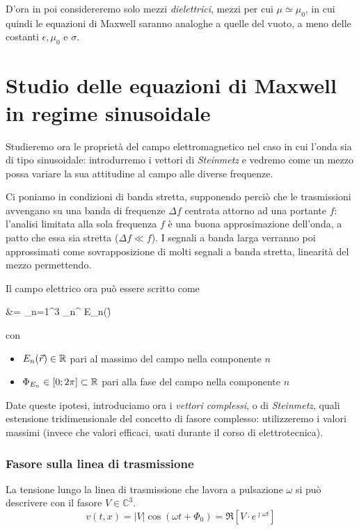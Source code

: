 D'ora in poi considereremo solo mezzi \emph{dielettrici}, mezzi per cui $\mu \simeq \mu_0$, in cui quindi le equazioni di Maxwell saranno analoghe a quelle del vuoto, a meno delle costanti $\epsilon, \mu_0$ e $\sigma$.

\section{Studio delle equazioni di Maxwell in regime sinusoidale}
Studieremo ora le proprietà del campo elettromagnetico nel caso in cui l'onda sia di tipo sinusoidale: introdurremo i vettori di \emph{Steinmetz} e vedremo come un mezzo possa variare la sua attitudine al campo alle diverse frequenze.

Ci poniamo in condizioni di banda stretta, supponendo perciò che le trasmissioni avvengano su una banda di frequenze $\Delta f$ centrata attorno ad una portante $f$: l'analisi limitata alla sola frequenza $f$ è una buona approsimazione dell'onda, a patto che essa sia stretta ($\Delta f \ll f$).
I segnali a banda larga verranno poi approssimati come sovrapposizione di molti segnali a banda stretta, linearità del mezzo permettendo.

Il campo elettrico ora può essere scritto come
\begin{esp}
	\ert &= \sum\limits_{n=1}^3 _n^{\prime\prime} \cdot E_n(\r)\cdot \cos{}\\
\end{esp}
con
\begin{itemize}
	\item $E_n (\vec{r}) \in \mathbb{R}$ pari al massimo del campo nella componente $n$
	\item $\Phi_{E_{n}} \in [0;2\pi]\subset \mathbb{R}$ pari alla fase del campo nella componente $n$
\end{itemize}

Date queste ipotesi, introduciamo ora i \emph{vettori complessi}, o di \emph{Steinmetz}, quali estensione tridimensionale del concetto di fasore complesso: utilizzeremo i valori massimi (invece che valori efficaci, usati durante il corso di elettrotecnica).

\subsubsection{Fasore sulla linea di trasmissione}

La tensione lungo la linea di trasmissione che lavora a pulsazione $\omega$ si può descrivere con il fasore $V \in \mathbb{C}^3$.
\begin{equation}
	v(t,x) = |V| \cos(\omega t + \Phi_0) = \Re\left[V \cdot e^{\jmath \omega t}\right]
\end{equation}


